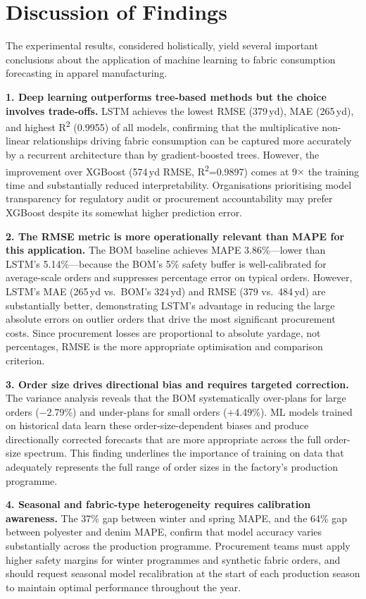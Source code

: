 \secdiv
\section{Discussion of Findings}

The experimental results, considered holistically, yield several important conclusions about the application of machine learning to fabric consumption forecasting in apparel manufacturing.

\textbf{1. Deep learning outperforms tree-based methods but the choice involves trade-offs.} LSTM achieves the lowest RMSE (379\,yd), MAE (265\,yd), and highest R\textsuperscript{2} (0.9955) of all models, confirming that the multiplicative non-linear relationships driving fabric consumption can be captured more accurately by a recurrent architecture than by gradient-boosted trees. However, the improvement over XGBoost (574\,yd RMSE, R\textsuperscript{2}=0.9897) comes at 9$\times$ the training time and substantially reduced interpretability. Organisations prioritising model transparency for regulatory audit or procurement accountability may prefer XGBoost despite its somewhat higher prediction error.

\textbf{2. The RMSE metric is more operationally relevant than MAPE for this application.} The BOM baseline achieves MAPE 3.86\%---lower than LSTM's 5.14\%---because the BOM's 5\% safety buffer is well-calibrated for average-scale orders and suppresses percentage error on typical orders. However, LSTM's MAE (265\,yd vs.\ BOM's 324\,yd) and RMSE (379 vs.\ 484\,yd) are substantially better, demonstrating LSTM's advantage in reducing the large absolute errors on outlier orders that drive the most significant procurement costs. Since procurement losses are proportional to absolute yardage, not percentages, RMSE is the more appropriate optimisation and comparison criterion.

\textbf{3. Order size drives directional bias and requires targeted correction.} The variance analysis reveals that the BOM systematically over-plans for large orders ($-$2.79\%) and under-plans for small orders ($+$4.49\%). ML models trained on historical data learn these order-size-dependent biases and produce directionally corrected forecasts that are more appropriate across the full order-size spectrum. This finding underlines the importance of training on data that adequately represents the full range of order sizes in the factory's production programme.

\textbf{4. Seasonal and fabric-type heterogeneity requires calibration awareness.} The 37\% gap between winter and spring MAPE, and the 64\% gap between polyester and denim MAPE, confirm that model accuracy varies substantially across the production programme. Procurement teams must apply higher safety margins for winter programmes and synthetic fabric orders, and should request seasonal model recalibration at the start of each production season to maintain optimal performance throughout the year.

